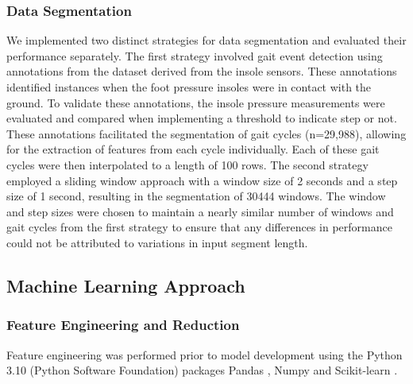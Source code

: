\documentclass[sensors,article,submit,pdftex,moreauthors]{Definitions/mdpi}
\begin{document}



\subsubsection{Data Segmentation}
We implemented two distinct strategies for data segmentation and evaluated their performance separately. The first strategy involved gait event detection using annotations from the dataset derived from the insole sensors. These annotations identified instances when the foot pressure insoles were in contact with the ground. To validate these annotations, the insole pressure measurements were evaluated and compared when implementing a threshold to indicate step or not. These annotations facilitated the segmentation of gait cycles (n=29,988), allowing for the extraction of features from each cycle individually. Each of these gait cycles were then interpolated to a length of 100 rows. The second strategy employed a sliding window approach with a window size of 2 seconds and a step size of 1 second, resulting in the segmentation of 30444 windows.  The window and step sizes were chosen to maintain a nearly similar number of windows and gait cycles from the first strategy to ensure that any differences in performance could not be attributed to variations in input segment length.

\subsection{Machine Learning Approach}
\subsubsection{Feature Engineering and Reduction}
Feature engineering was performed prior to model development using the Python 3.10 (Python Software Foundation) packages Pandas \cite{reback2020pandas}, Numpy \cite{harris2020array} and Scikit-learn \cite{scikit-learn}.
\end{document}
